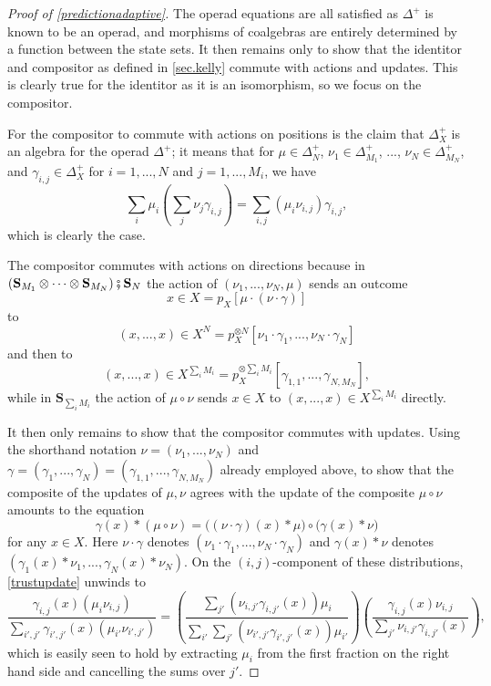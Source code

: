 \documentclass[11pt, one side, article]{memoir}
\theoremstyle{definition}
\theoremstyle{plain}
\newcommand{\Cat}[1]{\mathbf{#1}}%
\newcommand{\then}{\mathbin{\fatsemi}}
\newcommand{\0}{\textsf{0}}
\newcommand{\1}{\tn{\textsf{1}}}
\renewcommand{\S}{{\Cat{S}}}
\begin{document}
\begin{proof}[Proof of \cref{predictionadaptive}]
The operad equations are all satisfied as $\Delta^+$ is known to be an operad, and morphisms of coalgebras are entirely determined by a function between the state sets. It then remains only to show that the identitor and compositor as defined in \cref{sec.kelly} commute with actions and updates. This is clearly true for the identitor as it is an isomorphism, so we focus on the compositor.

For the compositor to commute with actions on positions is the claim that $\Delta^+_X$ is an algebra for the operad $\Delta^+$; it means that for $\mu \in \Delta^+_N$, $\nu_1 \in \Delta^+_{M_1}$, ..., $\nu_N \in \Delta^+_{M_N}$, and $\gamma_{i,j} \in \Delta^+_X$ for $i=1,...,N$ and $j=1,...,M_i$, we have
\[
\sum_i \mu_i \left(\sum_j \nu_j \gamma_{i,j}\right) = \sum_{i,j} (\mu_i \nu_{i,j})\gamma_{i,j},
\]
which is clearly the case.

The compositor commutes with actions on directions because in $(\S_{M_1} \otimes \cdots \otimes \S_{M_N}) \then \S_N$ the action of $(\nu_1,...,\nu_N,\mu)$ sends an outcome 
\[
x \in X = p_X[\mu \cdot (\nu \cdot \gamma)]
\]
to 
\[
(x,...,x) \in X^N = p_X^{\otimes N}[\nu_1 \cdot \gamma_1,...,\nu_N \cdot \gamma_N]
\]
and then to 
\[
(x,...,x) \in X^{\sum_i M_i} = p_X^{\otimes \sum_i M_i}[\gamma_{1,1},...,\gamma_{N,M_N}],
\]
while in $\S_{\sum_i M_i}$ the action of $\mu \circ \nu$ sends $x \in X$ to $(x,...,x) \in X^{\sum_i M_i}$ directly.

It then only remains to show that the compositor commutes with updates. Using the shorthand notation $\nu = (\nu_1,...,\nu_N)$ and $\gamma = (\gamma_1,...,\gamma_N) = (\gamma_{1,1},...,\gamma_{N,M_N})$ already employed above, to show that the composite of the updates of $\mu,\nu$ agrees with the update of the composite $\mu \circ \nu$ amounts to the equation
\begin{equation}\label{trustupdate}
\gamma(x) * (\mu \circ \nu) = \big((\nu \cdot \gamma)(x) * \mu\big) \circ \big(\gamma(x) * \nu\big)
\end{equation}
for any $x \in X$. Here $\nu \cdot \gamma$ denotes $(\nu_1 \cdot \gamma_1,...,\nu_N \cdot \gamma_N)$ and $\gamma(x) * \nu$ denotes $(\gamma_1(x) * \nu_1,...,\gamma_N(x) * \nu_N)$. On the $(i,j)$-component of these distributions, \eqref{trustupdate} unwinds to
\[
\frac{\gamma_{i,j}(x)(\mu_i\nu_{i,j})}{\sum_{i',j'}\gamma_{i',j'}(x)(\mu_{i'}\nu_{i',j'})} = \left(\frac{\sum_{j'}(\nu_{i,j'}\gamma_{i,j'}(x))\mu_i}{\sum_{i'}\sum_{j'}(\nu_{i',j'}\gamma_{i',j'}(x))\mu_{i'}}\right)\left(\frac{\gamma_{i,j}(x)\nu_{i,j}}{\sum_{j'}\nu_{i,j'}\gamma_{i,j'}(x)}\right),
\]
which is easily seen to hold by extracting $\mu_i$ from the first fraction on the right hand side and cancelling the sums over $j'$.
\end{proof}
\end{document}
